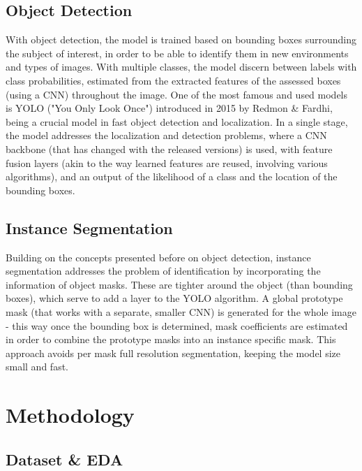 \documentclass[conference]{IEEEtran}
\begin{document}
\subsection{Object Detection}

With object detection, the model is trained based on bounding boxes surrounding the subject of interest, in order to be able to identify them in new environments and types of images. With multiple classes, the model discern between labels with class probabilities, estimated from the extracted features of the assessed boxes (using a CNN) throughout the image. One of the most famous and used models is YOLO ("You Only Look Once") introduced in 2015 by Redmon \& Fardhi, being a crucial model in fast object detection and localization. In a single stage, the model addresses the localization and detection problems, where a CNN backbone (that has changed with the released versions) is used, with feature fusion layers (akin to the way learned features are reused, involving various algorithms), and an output of the likelihood of a class and the location of the bounding boxes.

\subsection{Instance Segmentation}

Building on the concepts presented before on object detection, instance segmentation addresses the problem of identification by incorporating the information of object masks. These are tighter around the object (than bounding boxes), which serve to add a layer to the YOLO algorithm. A global prototype mask (that works with a separate, smaller CNN) is generated for the whole image - this way once the bounding box is determined, mask coefficients are estimated in order to combine the prototype masks into an instance specific mask. This approach avoids per mask full resolution segmentation, keeping the model size small and fast.



\section{Methodology}

\subsection{Dataset \& EDA}
\end{document}
